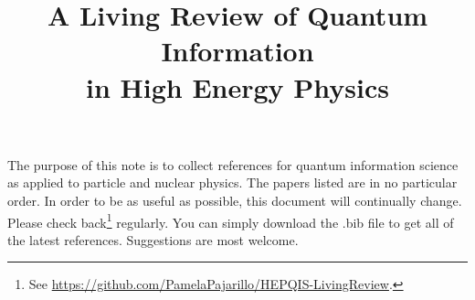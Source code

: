 \documentclass[12pt,letterpaper]{article}
\title{\boldmath A Living Review of Quantum Information \\ in High Energy Physics}
\begin{document}
\maketitle

The purpose of this note is to collect references for quantum information science as applied to particle and nuclear physics.  The papers listed are in no particular order.  In order to be as useful as possible, this document will continually change. Please check back\footnote[2]{See \href{https://github.com/PamelaPajarillo/HEPQIS-LivingReview}{https://github.com/PamelaPajarillo/HEPQIS-LivingReview}.} regularly.  You can simply download the .bib file to get all of the latest references.  Suggestions are most welcome.



\clearpage
\flushbottom
%


\end{document}

